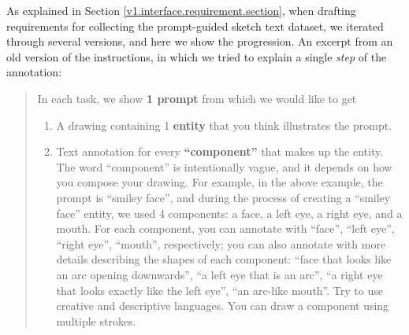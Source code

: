 As explained in Section \ref{v1.interface.requirement.section}, when drafting requirements for collecting the prompt-guided sketch text dataset, we iterated through several versions, and here we show the progression.
An excerpt from an old version of the instructions, in which we tried to explain a single \textit{step} of the annotation:
\begin{quotation}
In each task, we show \textbf{1 prompt} from which we would like to get
\begin{enumerate}
    \item A drawing containing 1 \textbf{entity} that you think illustrates the prompt.
    \item Text annotation for every \textbf{``component''} that makes up the entity.
    The word ``component'' is intentionally vague, and it depends on how you compose your drawing. For example, in the above example, the prompt is ``smiley face'', and during the process of creating a ``smiley face'' entity, we used 4 components: a face, a left eye, a right eye, and a mouth. For each component, you can annotate with ``face'', ``left eye'', ``right eye'', ``mouth'', respectively; you can also annotate with more details describing the shapes of each component: ``face that looks like an arc opening downwards'', ``a left eye that is an arc'', ``a right eye that looks exactly like the left eye'', ``an arc-like mouth''. Try to use creative and descriptive languages. You can draw a component using multiple strokes.
\end{enumerate}
\end{quotation}

